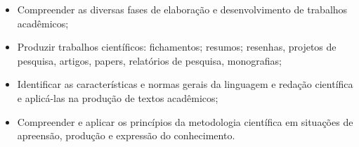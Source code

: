 \begin{itemize}
\item Compreender as diversas fases de elaboração e desenvolvimento de trabalhos acadêmicos;

\item Produzir trabalhos científicos: fichamentos; resumos; resenhas, projetos de pesquisa, artigos, papers, relatórios de pesquisa, monografias;

\item Identificar as características e normas gerais da linguagem e redação científica e aplicá-las na produção de textos acadêmicos;

\item Compreender e aplicar os princípios da metodologia científica em situações de apreensão, produção e expressão do conhecimento.

\end{itemize} 












